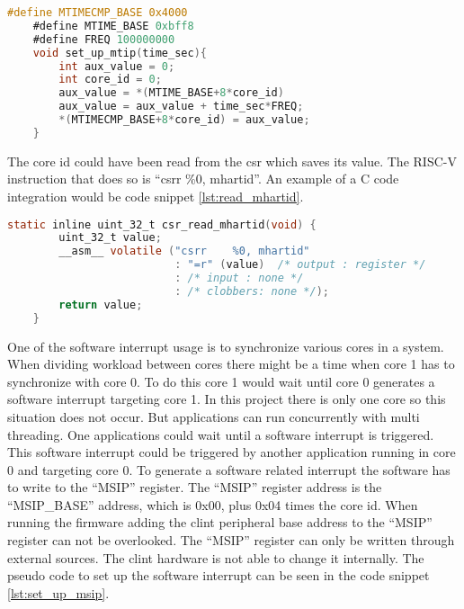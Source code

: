 \begin{lstlisting}[language=C, caption={Set Up Timer Interrupt.}, label=lst:set_up_mtip]
    #define MTIMECMP_BASE 0x4000
    #define MTIME_BASE 0xbff8
    #define FREQ 100000000
    void set_up_mtip(time_sec){
        int aux_value = 0;
        int core_id = 0;
        aux_value = *(MTIME_BASE+8*core_id)
        aux_value = aux_value + time_sec*FREQ;
        *(MTIMECMP_BASE+8*core_id) = aux_value;
    }
\end{lstlisting}

The core id could have been read from the \acrshort{csr} which saves its value. The RISC-V instruction that does so is \enquote{csrr    \%0, mhartid}. An example of a C code integration would be code snippet \ref*{lst:read_mhartid}.

\begin{lstlisting}[language=C, caption={Read core id from \acrshort{csr}.}, label=lst:read_mhartid]
    static inline uint_32_t csr_read_mhartid(void) {
        uint_32_t value;        
        __asm__ volatile ("csrr    %0, mhartid" 
                          : "=r" (value)  /* output : register */
                          : /* input : none */
                          : /* clobbers: none */);
        return value;
    }
\end{lstlisting}

One of the software interrupt usage is to synchronize various cores in a system. When dividing workload between cores there might be a time when core 1 has to synchronize with core 0. To do this core 1 would wait until core 0 generates a software interrupt targeting core 1. In this project there is only one core so this situation does not occur. But applications can run concurrently with multi threading. One applications could wait until a software interrupt is triggered. This software interrupt could be triggered by another application running in core 0 and targeting core 0. To generate a software related interrupt the software has to write to the \enquote{MSIP} register. The \enquote{MSIP} register address is the \enquote{MSIP\_BASE} address, which is 0x00, plus 0x04 times the core id. When running the firmware adding the \acrshort{clint} peripheral base address to the \enquote{MSIP} register can not be overlooked. The \enquote{MSIP} register can only be written through external sources. The \acrshort{clint} hardware is not able to change it internally. The pseudo code to set up the software interrupt can be seen in the code snippet \ref*{lst:set_up_msip}. 

